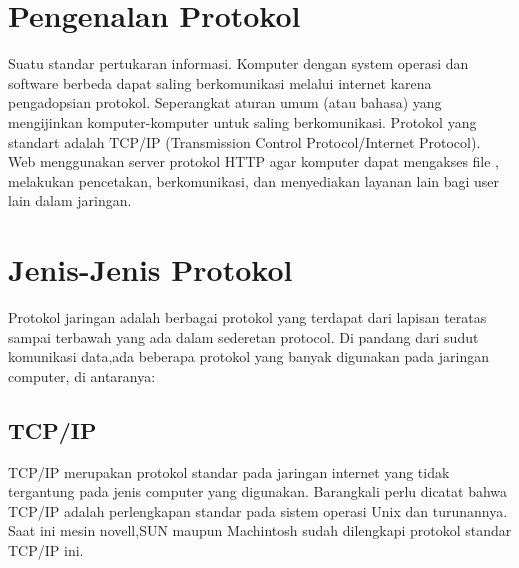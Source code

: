 

\section{Pengenalan Protokol} 
 Suatu standar pertukaran informasi. Komputer dengan system operasi dan software berbeda dapat saling berkomunikasi melalui internet 
 karena pengadopsian protokol. Seperangkat aturan umum (atau bahasa) yang mengijinkan komputer-komputer untuk saling berkomunikasi. 
 Protokol yang standart adalah TCP/IP (Transmission Control Protocol/Internet Protocol). Web menggunakan server protokol HTTP agar 
 komputer dapat mengakses file , melakukan pencetakan, berkomunikasi, dan menyediakan layanan lain bagi user lain dalam jaringan.
 
 \section{Jenis-Jenis Protokol}
Protokol jaringan adalah berbagai protokol yang terdapat dari lapisan  teratas sampai terbawah yang ada dalam sederetan protocol.
Di pandang dari sudut komunikasi data,ada beberapa protokol yang banyak digunakan pada jaringan computer, di antaranya:

\subsection{TCP/IP}
TCP/IP merupakan protokol standar pada jaringan internet yang tidak tergantung pada jenis computer yang digunakan.
Barangkali perlu dicatat bahwa TCP/IP adalah perlengkapan standar pada sistem operasi Unix dan turunannya.
Saat ini mesin novell,SUN maupun Machintosh sudah dilengkapi protokol standar TCP/IP ini.

  \subsection{} 
   
    
  \subsection{} 
    
